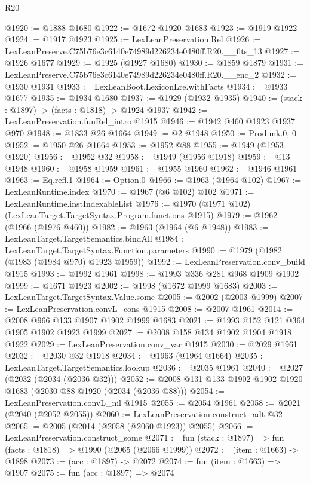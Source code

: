 \begin{lexlean}{R20}
\begin{coremodule}
@1920 := @1888 @1680
@1922 := @1672 @1920 @1683
@1923 := @1919 @1922
@1924 := @1917 @1923
@1925 := LexLeanPreservation.Rel
@1926 := LexLeanPreserve.C75b76e3c6140e74989d226234e0480ff.R20.__fits_13
@1927 := @1926 @1677
@1929 := @1925 (@1927 @1680)
@1930 := @1859 @1879
@1931 := LexLeanPreserve.C75b76e3c6140e74989d226234e0480ff.R20.__enc_2
@1932 := @1930 @1931
@1933 := LexLeanBoot.LexiconLre.withFacts
@1934 := @1933 @1677
@1935 := @1934 @1680
@1937 := @1929 (@1932 @1935)
@1940 := (stack : @1897) -> (facts : @1818) -> @1924 @1937
@1942 := LexLeanPreservation.funRel_intro @1915
@1946 := @1942 @460 @1923 @1937 @970
@1948 := @1833 @26 @1664
@1949 := @2 @1948
@1950 := Prod.mk.{0, 0}
@1952 := @1950 @26 @1664
@1953 := @1952 @88
@1955 := @1949 (@1953 @1920)
@1956 := @1952 @32
@1958 := @1949 (@1956 @1918)
@1959 := @13 @1948
@1960 := @1958 @1959
@1961 := @1955 @1960
@1962 := @1946 @1961
@1963 := Eq.refl.{1}
@1964 := Option.{0}
@1966 := @1963 (@1964 @102)
@1967 := LexLeanRuntime.index
@1970 := @1967 (@6 @102) @102
@1971 := LexLeanRuntime.instIndexableList
@1976 := @1970 (@1971 @102) (LexLeanTarget.TargetSyntax.Program.functions @1915)
@1979 := @1962 (@1966 (@1976 @460))
@1982 := @1963 (@1964 (@6 @1948))
@1983 := LexLeanTarget.TargetSemantics.bindAll
@1984 := LexLeanTarget.TargetSyntax.Function.parameters
@1990 := @1979 (@1982 (@1983 (@1984 @970) @1923 @1959))
@1992 := LexLeanPreservation.conv_build @1915
@1993 := @1992 @1961
@1998 := @1993 @336 @281 @968 @1909 @1902
@1999 := @1671 @1923
@2002 := @1998 (@1672 @1999 @1683)
@2003 := LexLeanTarget.TargetSyntax.Value.some
@2005 := @2002 (@2003 @1999)
@2007 := LexLeanPreservation.convL_cons @1915
@2008 := @2007 @1961
@2014 := @2008 @966 @133 @1907 @1902 @1999 @1683
@2021 := @1993 @152 @121 @364 @1905 @1902 @1923 @1999
@2027 := @2008 @158 @134 @1902 @1904 @1918 @1922
@2029 := LexLeanPreservation.conv_var @1915
@2030 := @2029 @1961
@2032 := @2030 @32 @1918
@2034 := @1963 (@1964 @1664)
@2035 := LexLeanTarget.TargetSemantics.lookup
@2036 := @2035 @1961
@2040 := @2027 (@2032 (@2034 (@2036 @32)))
@2052 := @2008 @131 @133 @1902 @1902 @1920 @1683 (@2030 @88 @1920 (@2034 (@2036 @88)))
@2054 := LexLeanPreservation.convL_nil @1915
@2055 := @2054 @1961
@2058 := @2021 (@2040 (@2052 @2055))
@2060 := LexLeanPreservation.construct_adt @32
@2065 := @2005 (@2014 (@2058 (@2060 @1923)) @2055)
@2066 := LexLeanPreservation.construct_some
@2071 := fun (stack : @1897) => fun (facts : @1818) => @1990 (@2065 (@2066 @1999))
@2072 := (item : @1663) -> @1898
@2073 := (acc : @1897) -> @2072
@2074 := fun (item : @1663) => @1907
@2075 := fun (acc : @1897) => @2074

\end{coremodule}
\end{lexlean}
